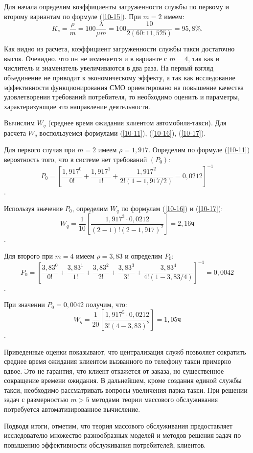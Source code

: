 Для начала определим коэффициенты загруженности службы по первому и второму вариантам по формуле (\ref{10-15}). При $m =2$ имеем:
\[ K_s = \dfrac{\rho}{m} = 100 \dfrac{\lambda}{\mu m} = 100 \dfrac{10}{2(60:11,525)} = 95,8\%. \]

Как видно из расчета, коэффициент загруженности службы такси достаточно высок. Очевидно. что он не изменяется и в варианте с $m =4$, так как и числитель и знаменатель увеличиваются в два раза. На первый взгляд объединение не приводит к экономическому эффекту, а так как исследование эффективности функционирования СМО ориентировано на повышение качества удовлетворения требований потребителя, то необходимо оценить и параметры, характеризующие это направление деятельности.

Вычислим $W_q$ (среднее время ожидания  клиентом автомобиля-такси). Для расчета $W_q$ воспользуемся формулами (\ref{10-11}), (\ref{10-16}), (\ref{10-17}).

Для первого случая при $m =2$ имеем $\rho = 1,917$. Определим по формуле (\ref{10-11}) вероятность того, что в системе нет требований $(P_0)$:
\[ P_0 = \left[\dfrac{1,917^0}{0!} + \dfrac{1,917^1}{1!} + \dfrac{1,917^2}{2!(1 - 1,917/2)} = 0,0212 \right]^{-1} \].

Используя значение $  P_0$, определим $  W_q$ по формулам (\ref{10-16}) и (\ref{10-17}):
\[ W_q = \dfrac{1}{10}\left[\dfrac{1,917^3 \cdot 0,0212}{(2-1)!(2-1,917)^2}\right] = 2,16 \text{ч} \].

Для второго при $ m =4 $ имеем $  \rho = 3,83$ и определим $  P_0$:
\[ P_0 = \left[\dfrac{3,83^0}{0!} + \dfrac{3,83^1}{1!} + \dfrac{3,83^2}{2!} + \dfrac{3,83^3}{3!} + \dfrac{3,83^4}{4!(1 - 3,83/4)}\right]^{-1} = 0,0042 \].

При значении $ P_0 = 0,0042 $ получим, что:
\[ W_q = \dfrac{1}{20} \left[\dfrac{1,917^5 \cdot 0,0212}{3!(4 - 3,83)^2}\right] = 1,05 \text{ч}\].

Приведенные оценки показывают, что централизация служб позволяет сократить среднее время ожидания клиентом вызванного по телефону такси примерно вдвое. Это не гарантия, что клиент откажется от заказа, но существенное сокращение времени ожидания. В дальнейшем, кроме создания единой службы такси, необходимо рассматривать вопросы увеличения парка такси. При решении задач с размерностью $m > 5$ методами теории массового обслуживания потребуется автоматизированное вычисление.

Подводя итоги, отметим, что теория массового обслуживания предоставляет исследователю множество разнообразных моделей и методов решения задач по повышению эффективности обслуживания потребителей, клиентов.